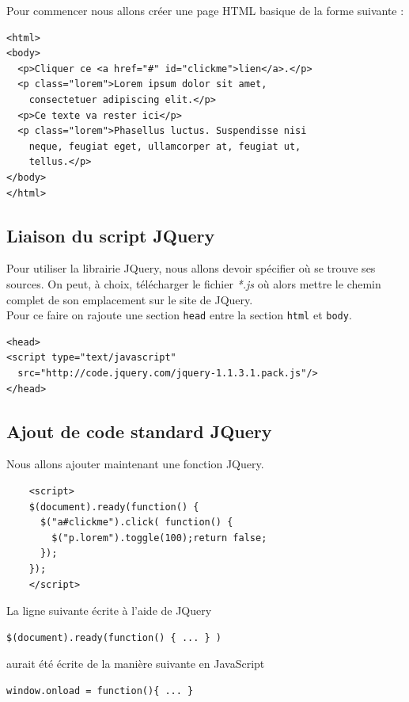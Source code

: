 \documentclass[10pt,a4paper,titlepage]{article}
\begin{document}
Pour commencer nous allons créer une page HTML basique de la forme suivante :

\begin{lstlisting}
<html>
<body>
  <p>Cliquer ce <a href="#" id="clickme">lien</a>.</p>
  <p class="lorem">Lorem ipsum dolor sit amet,
    consectetuer adipiscing elit.</p>
  <p>Ce texte va rester ici</p>
  <p class="lorem">Phasellus luctus. Suspendisse nisi
  	neque, feugiat eget, ullamcorper at, feugiat ut,
  	tellus.</p>
</body>
</html>
\end{lstlisting}

\subsection{Liaison du script JQuery}

Pour utiliser la librairie JQuery, nous allons devoir spécifier où se trouve ses sources. On peut, à choix, télécharger le fichier \emph{*.js} où alors mettre le chemin complet de son emplacement sur le site de JQuery. \\

Pour ce faire on rajoute une section \texttt{head} entre la section \texttt{html} et \texttt{body}.

\begin{lstlisting}
<head>
<script type="text/javascript"
  src="http://code.jquery.com/jquery-1.1.3.1.pack.js"/>
</head>
\end{lstlisting}

\subsection{Ajout de code standard JQuery}

Nous allons ajouter maintenant une fonction JQuery.

\begin{lstlisting}
	<script>
	$(document).ready(function() {
	  $("a#clickme").click( function() {
	    $("p.lorem").toggle(100);return false;
	  });
	});
	</script>
\end{lstlisting}

La ligne suivante écrite à l'aide de JQuery

\begin{lstlisting}
$(document).ready(function() { ... } )
\end{lstlisting}

aurait été écrite de la manière suivante en JavaScript  

\begin{lstlisting}
window.onload = function(){ ... }
\end{lstlisting}
\end{document}
